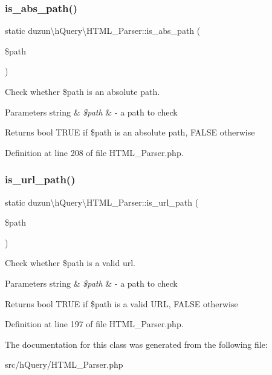 \subsubsection{\texorpdfstring{is\+\_\+abs\+\_\+path()}{is\_abs\_path()}}
{\footnotesize\ttfamily static duzun\textbackslash{}h\+Query\textbackslash{}\+H\+T\+M\+L\+\_\+\+Parser\+::is\+\_\+abs\+\_\+path (\begin{DoxyParamCaption}\item[{}]{\$path }\end{DoxyParamCaption})\hspace{0.3cm}{\ttfamily [static]}}

Check whether \$path is an absolute path.


\begin{DoxyParams}[1]{Parameters}
string & {\em \$path} & -\/ a path to check\\
\hline
\end{DoxyParams}
\begin{DoxyReturn}{Returns}
bool T\+R\+UE if \$path is an absolute path, F\+A\+L\+SE otherwise 
\end{DoxyReturn}


Definition at line 208 of file H\+T\+M\+L\+\_\+\+Parser.\+php.

\mbox{\label{classduzun_1_1hQuery_1_1HTML__Parser_ae0f17bc6b740af406a317dc79ae09dbd}} 
\subsubsection{\texorpdfstring{is\+\_\+url\+\_\+path()}{is\_url\_path()}}
{\footnotesize\ttfamily static duzun\textbackslash{}h\+Query\textbackslash{}\+H\+T\+M\+L\+\_\+\+Parser\+::is\+\_\+url\+\_\+path (\begin{DoxyParamCaption}\item[{}]{\$path }\end{DoxyParamCaption})\hspace{0.3cm}{\ttfamily [static]}}

Check whether \$path is a valid url.


\begin{DoxyParams}[1]{Parameters}
string & {\em \$path} & -\/ a path to check\\
\hline
\end{DoxyParams}
\begin{DoxyReturn}{Returns}
bool T\+R\+UE if \$path is a valid U\+RL, F\+A\+L\+SE otherwise 
\end{DoxyReturn}


Definition at line 197 of file H\+T\+M\+L\+\_\+\+Parser.\+php.



The documentation for this class was generated from the following file\+:\begin{DoxyCompactItemize}
\item 
src/h\+Query/H\+T\+M\+L\+\_\+\+Parser.\+php\end{DoxyCompactItemize}
